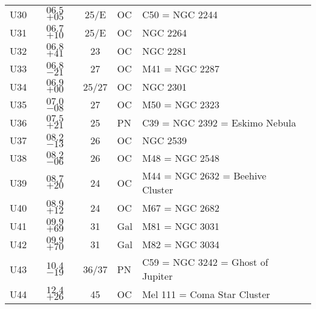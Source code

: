 \begin{table}[p]
\begin{tabular}{lcclll}
U30 &$06.5$ $+05$&25/E&OC &C50 = NGC 2244\\
U31 &$06.7$ $+10$&25/E&OC &NGC 2264\\
U32 &$06.8$ $+41$&23&OC &NGC 2281\\
U33 &$06.8$ $-21$&27&OC &M41 = NGC 2287\\
U34 &$06.9$ $+00$&25/27&OC &NGC 2301\\
U35 &$07.0$ $-08$&27&OC &M50 = NGC 2323\\
U36 &$07.5$ $+21$&25&PN &C39 = NGC 2392 = Eskimo Nebula\\
U37 &$08.2$ $-13$&26&OC &NGC 2539\\
U38 &$08.2$ $-06$&26&OC &M48 = NGC 2548\\
U39 &$08.7$ $+20$&24&OC &M44 = NGC 2632 = Beehive Cluster\\
U40 &$08.9$ $+12$&24&OC &M67 = NGC 2682\\
U41 &$09.9$ $+69$&31&Gal&M81 = NGC 3031\\
U42 &$09.9$ $+70$&31&Gal&M82 = NGC 3034\\
U43 &$10.4$ $-19$&36/37&PN &C59 = NGC 3242 = Ghost of Jupiter\\
U44 &$12.4$ $+26$&45&OC &Mel 111 = Coma Star Cluster\\
\hline
\end{tabular}
\end{table}
\clearpage


